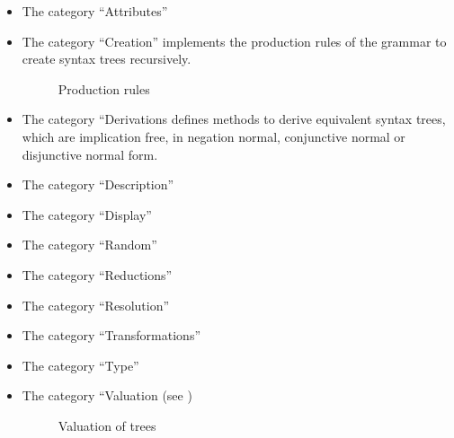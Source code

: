 \begin{itemize}
\item The category “Attributes”  

\item The category “Creation” implements the production rules of the grammar to create syntax trees recursively.

\begin{figure}[htbp]
\begin{center}
\caption{Production rules}
\label{fig:NyayaNodeCreation}
\end{center}
\end{figure}

\item The category “Derivations defines methods to derive equivalent syntax trees, which are implication free, in negation normal, conjunctive normal or disjunctive normal form.

\item The category “Description”
\item The category “Display”  %
\item The category “Random”
\item The category “Reductions”
\item The category “Resolution”
\item The category “Transformations”
\item The category “Type”
\item The category “Valuation (see )

\begin{figure}[htbp]
\begin{center}
\caption{Valuation of trees}
\label{fig:NyayaNodeValuation}
\end{center}
\end{figure}

\end{itemize}





